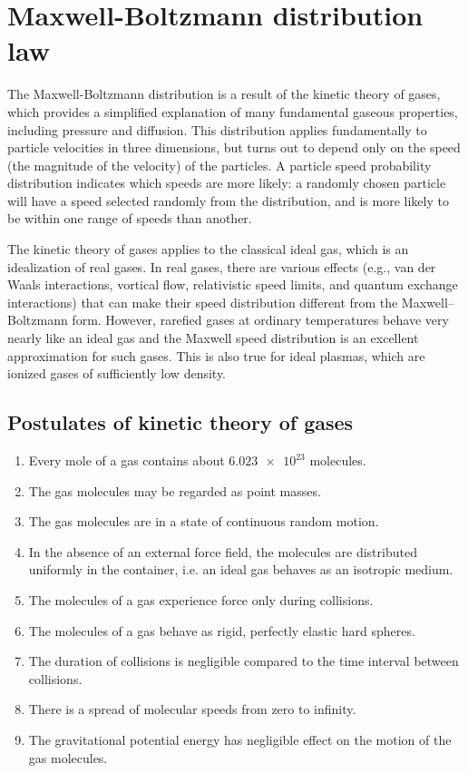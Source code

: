 \section{Maxwell-Boltzmann distribution law}
	The Maxwell-Boltzmann distribution is a result of the kinetic theory of gases, which provides a simplified explanation of many fundamental gaseous properties, including pressure and diffusion. This distribution applies fundamentally to particle velocities in three dimensions, but turns out to depend only on the speed (the magnitude of the velocity) of the particles. A particle speed probability distribution indicates which speeds are more likely: a randomly chosen particle will have a speed selected randomly from the distribution, and is more likely to be within one range of speeds than another.
	
	The kinetic theory of gases applies to the classical ideal gas, which is an idealization of real gases. In real gases, there are various effects (e.g., van der Waals interactions, vortical flow, relativistic speed limits, and quantum exchange interactions) that can make their speed distribution different from the Maxwell–Boltzmann form. However, rarefied gases at ordinary temperatures behave very nearly like an ideal gas and the Maxwell speed distribution is an excellent approximation for such gases. This is also true for ideal plasmas, which are ionized gases of sufficiently low density.
	
	\subsection{Postulates of kinetic theory of gases}
		\begin{enumerate}
			\item Every mole of a gas contains about $\num{6.023e23}$ molecules.
			\item The gas molecules may be regarded as point masses.
			\item The gas molecules are in a state of continuous random motion.
			\item In the absence of an external force field, the molecules are distributed uniformly in the container, i.e. an ideal gas behaves as an isotropic medium.
			\item The molecules of a gas experience force only during collisions.
			\item The molecules of a gas behave as rigid, perfectly elastic hard spheres.
			\item The duration of collisions is negligible compared to the time interval between collisions.
			\item There is a spread of molecular speeds from zero to infinity.
			\item The gravitational potential energy has negligible effect on the motion of the gas molecules.
		\end{enumerate}
	
